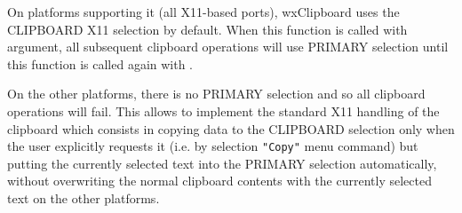 
On platforms supporting it (all X11-based ports), wxClipboard uses the
CLIPBOARD X11 selection by default. When this function is called with \true
argument, all subsequent clipboard operations will use PRIMARY selection until
this function is called again with \false.

On the other platforms, there is no PRIMARY selection and so all clipboard
operations will fail. This allows to implement the standard X11 handling of the
clipboard which consists in copying data to the CLIPBOARD selection only when
the user explicitly requests it (i.e. by selection \texttt{"Copy"} menu
command) but putting the currently selected text into the PRIMARY selection
automatically, without overwriting the normal clipboard contents with the
currently selected text on the other platforms.

